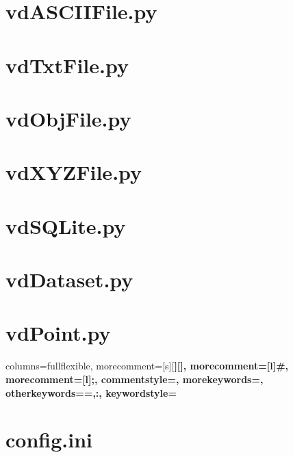 \documentclass[a4paper,12pt,bibliography=totoc, listof=totoc,titlepage,pointlessnumbers]{scrreprt}
\begin{document}
\begin{appendices}
\section{vdASCIIFile.py}
\label{a:vdASCIIFile.py}


\section{vdTxtFile.py}
\label{a:vdTxtFile.py}


\section{vdObjFile.py}
\label{a:vdObjFile.py}


\section{vdXYZFile.py}
\label{a:vdXYZFile.py}


\section{vdSQLite.py}
\label{a:vdSQLite.py}


\section{vdDataset.py}
\label{a:vdDataset.py}


\section{vdPoint.py}
\label{a:vdPoint.py}


{
    columns=fullflexible,
    morecomment=[s][\color{Orchid}\bfseries]{[}{]},
    morecomment=[l]{\#},
    morecomment=[l]{;},
    commentstyle=\color{gray}\ttfamily,
    morekeywords={},
    otherkeywords={=,:},
    keywordstyle={\color{green}\bfseries}
}

\section{config.ini}
\label{a:config.ini}



\end{appendices}
\end{document}
